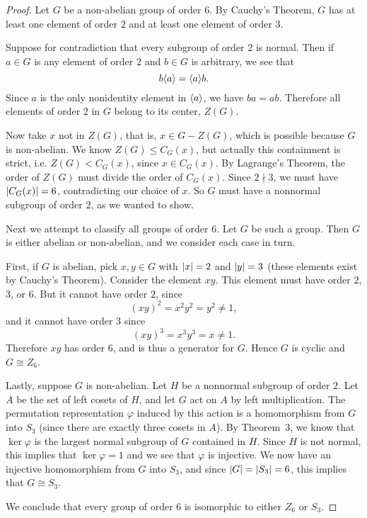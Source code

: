 \begin{proof}
  Let $G$ be a non-abelian group of order $6$. By Cauchy's Theorem,
  $G$ has at least one element of order $2$ and at least one element
  of order $3$.

  Suppose for contradiction that every subgroup of
  order $2$ is normal. Then if $a\in G$ is any element of order $2$
  and $b\in G$ is arbitrary, we see that
  \begin{equation*}
    b\langle{a}\rangle = \langle{a}\rangle b.
  \end{equation*}
  Since $a$ is the only nonidentity element in $\langle{a}\rangle$, we have
  $ba = ab$. Therefore all elements of order $2$ in $G$ belong to its
  center, $Z(G)$.

  Now take $x$ not in $Z(G)$, that is, $x\in G - Z(G)$, which is
  possible because $G$ is non-abelian. We know $Z(G)\leq C_G(x)$, but
  actually this containment is strict, i.e. $Z(G)<C_G(x)$, since
  $x\in C_G(x)$. By Lagrange's Theorem, the order of $Z(G)$ must
  divide the order of $C_G(x)$. Since $2\nmid3$, we must have
  $\lvert{C_G(x)}\rvert = 6$, contradicting our choice of $x$. So $G$ must
  have a nonnormal subgroup of order $2$, as we wanted to show.

  Next we attempt to classify all groups of order $6$. Let $G$ be such
  a group. Then $G$ is either abelian or non-abelian, and we consider
  each case in turn.

  First, if $G$ is abelian, pick $x,y\in G$ with $\lvert{x}\rvert = 2$ and
  $\lvert{y}\rvert = 3$ (these elements exist by Cauchy's Theorem). Consider
  the element $xy$. This element must have order $2$, $3$, or $6$. But
  it cannot have order $2$, since
  \begin{equation*}
    (xy)^2 = x^2y^2 = y^2 \neq 1,
  \end{equation*}
  and it cannot have order $3$ since
  \begin{equation*}
    (xy)^3 = x^3y^3 = x \neq 1.
  \end{equation*}
  Therefore $xy$ has order $6$, and is thus a generator for $G$. Hence
  $G$ is cyclic and $G\cong Z_6$.

  Lastly, suppose $G$ is non-abelian. Let $H$ be a nonnormal subgroup
  of order $2$. Let $A$ be the set of left cosets of $H$, and let $G$
  act on $A$ by left multiplication. The permutation representation
  $\varphi$ induced by this action is a homomorphism from $G$ into
  $S_3$ (since there are exactly three cosets in $A$). By Theorem~3,
  we know that $\ker\varphi$ is the largest normal subgroup of $G$
  contained in $H$. Since $H$ is not normal, this implies that
  $\ker\varphi = 1$ and we see that $\varphi$ is injective. We now
  have an injective homomorphism from $G$ into $S_3$, and since
  $\lvert{G}\rvert = \lvert{S_3}\rvert = 6$, this implies that $G\cong S_3$.

  We conclude that every group of order $6$ is isomorphic to either
  $Z_6$ or $S_3$.
\end{proof}

